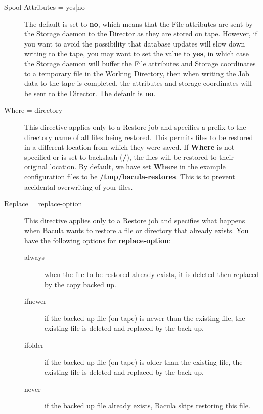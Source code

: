 \begin{description}
\item [Spool Attributes = \lt{}yes|no\gt{}]
   The default is set to  {\bf no}, which means that the File attributes are sent
by the  Storage daemon to the Director as they are stored on tape. However, 
if you want to avoid the possibility that database updates will  slow down
writing to the tape, you may want to set the value to  {\bf yes}, in which
case the Storage daemon will buffer the  File attributes and Storage
coordinates to a temporary file  in the Working Directory, then when writing
the Job data to the tape is  completed, the attributes and storage coordinates
will be  sent to the Director. The default is {\bf no}. 

\item [Where = \lt{}directory\gt{}]
   This directive applies only  to a Restore job and specifies a prefix to the
directory name  of all files being restored. This permits files to be restored
in a different location from which they were saved. If {\bf Where}  is not
specified or is set to backslash ({\bf /}), the files  will be restored to
their original location. By default, we  have set {\bf Where} in the example
configuration files to be  {\bf /tmp/bacula-restores}. This is to prevent
accidental overwriting  of your files. 

\item [Replace = \lt{}replace-option\gt{}]
   This directive applies only  to a Restore job and specifies what happens when
Bacula wants to  restore a file or directory that already exists. You have the
 following options for {\bf replace-option}:  

\begin{description}

\item [always]
  when the file to be restored already exists,  it is deleted then replaced by
  the copy backed up.  

\item [ifnewer]
  if the backed up file (on tape) is newer than the  existing file, the existing
  file is deleted and replaced by  the back up.  

\item [ifolder]
  if the backed up file (on tape) is older than the  existing file, the existing
  file is deleted and replaced by  the back up.  

\item [never]
  if the backed up file already exists, Bacula skips  restoring this file.  
\end{description}


\end{description}
